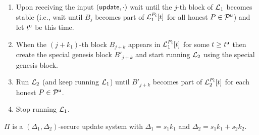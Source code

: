 \begin{enumerate}
	\item Upon receiving the input $(\mathsf{update}, \cdot)$ wait until the $j$-th block of $\mathcal{L}_1$ becomes stable (i.e., wait until $B_{j}$ becomes part of $\mathcal{L}_1^{P_i}[t]$ 
	for all honest $P\in\mathcal{P}^\mathsf{u}$) and let $t^{\mathsf{u}}$ be this time. 
	
	\item When the $(j+k_1)$-th block $B_{j+k}$ appears in $\mathcal{L}_1^{P_i}[t]$ for some $t\geq t^{\mathsf{u}}$ then create the special genesis block $B'_{j+k}$
	and start running $\mathcal{L}_2$ using the special genesis block. 
	\item Run $\mathcal{L}_2$ (and keep running $\mathcal{L}_1$) until $B'_{j+k}$ becomes part of $\mathcal{L}_2^{P_i}[t]$ 
	for each honest $P\in\mathcal{P}^\mathsf{u}$.
	\item Stop running $\mathcal{L}_1$.
\end{enumerate}



\begin{theorem}
$\Pi$ is a $(\Delta_1,\Delta_2)$-secure update system with $\Delta_1=s_1 k_1$ and $\Delta_2=s_1 k_1 + s_2 k_2$.
\end{theorem}

